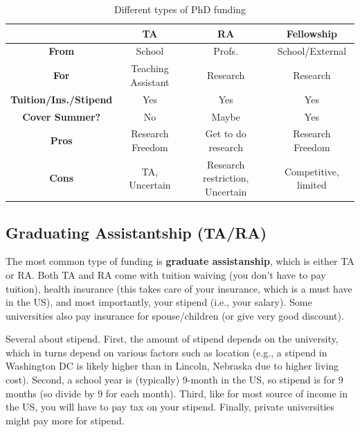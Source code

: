\documentclass[11pt]{article}
\begin{document}
\begin{table}
  \centering
  \footnotesize
  \caption{Different types of PhD funding}\label{tab:funding}
  \begin{tabular}{c|c|c|c}
    \toprule
    &\textbf{TA}&\textbf{RA}&\textbf{Fellowship}\\
    \midrule
    \textbf{From} & School & Profs. & School/External\\
    \textbf{For}                  & Teaching Assistant       & Research                        & Research                              \\
    \textbf{Tuition/Ins./Stipend} & Yes                      & Yes                             & Yes                                   \\
    \textbf{Cover Summer?}              & No                       & Maybe                           & Yes                                   \\
    \midrule
    \textbf{Pros}                 & Research Freedom         & Get to do research              & Research Freedom                      \\
    \textbf{Cons}                 & TA, Uncertain            & Research restriction, Uncertain & Competitive, limited             \\
    \bottomrule
  \end{tabular}
\end{table}

\subsection{Graduating Assistantship (TA/RA)}
The most common type of funding is \textbf{graduate assistanship}, which is either TA or RA. Both TA and RA come with tuition waiving (you don't have to pay tuition), health insurance (this takes care of your insurance, which is a must have in the US), and most importantly, your stipend (i.e., your salary). Some universities also pay insurance for spouse/children (or give very good discount).

Several about stipend. First, the amount of stipend depends on the university, which in turns depend on various factors such as location (e.g., a stipend in Washington DC is likely higher than in Lincoln, Nebraska due to higher living cost). Second, a school year is (typically) 9-month in the US, so stipend is for 9 months (so divide by 9 for each month). Third, like for most source of income in the US, you will have to pay tax on your stipend. Finally, private universities might pay more for stipend.
\end{document}
